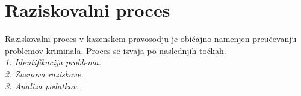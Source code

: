 \documentclass[12pt,a4paper]{amsart}
\theoremstyle{definition} %
\theoremstyle{plain} %
\begin{document}
\section{Raziskovalni proces}
Raziskovalni proces v kazenskem pravosodju je običajno namenjen preučevanju problemov kriminala. Proces se izvaja po naslednjih točkah.\\
\textit{1. Identifikacija problema.\\} 
\textit{2. Zasnova raziskave.\\} 
\textit{3. Analiza podatkov.\\}

\end{document}
